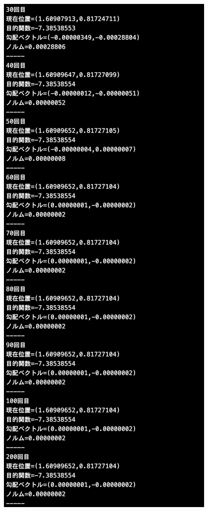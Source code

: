 \documentclass[12pt]{jarticle}
\begin{document}
\begin{figure}[h]
\begin{minipage}{0.5\hsize}
\begin{center}
            \includegraphics[scale=0.2]{kadai1_1s_out3_3_2.png}
        \end{center}
    \end{minipage}
    \begin{minipage}{0.5\hsize}

\end{minipage}
\end{figure}
\end{document}
